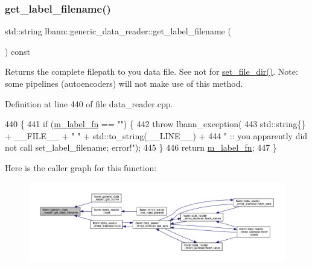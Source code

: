 \subsubsection{\texorpdfstring{get\+\_\+label\+\_\+filename()}{get\_label\_filename()}}
{\footnotesize\ttfamily std\+::string lbann\+::generic\+\_\+data\+\_\+reader\+::get\+\_\+label\+\_\+filename (\begin{DoxyParamCaption}{ }\end{DoxyParamCaption}) const}

Returns the complete filepath to you data file. See not for \hyperlink{classlbann_1_1generic__data__reader_a94a6db0b62d4c98202ef309eb76b220c}{set\+\_\+file\+\_\+dir()}. Note\+: some pipelines (autoencoders) will not make use of this method. 

Definition at line 440 of file data\+\_\+reader.\+cpp.


\begin{DoxyCode}
440                                                         \{
441   \textcolor{keywordflow}{if} (\hyperlink{classlbann_1_1generic__data__reader_a492d45c107df31b3e241e54d51950746}{m\_label\_fn} == \textcolor{stringliteral}{""}) \{
442     \textcolor{keywordflow}{throw} lbann\_exception(
443       std::string\{\} + \_\_FILE\_\_ + \textcolor{stringliteral}{" "} + std::to\_string(\_\_LINE\_\_) +
444       \textcolor{stringliteral}{" :: you apparently did not call set\_label\_filename; error!"});
445   \}
446   \textcolor{keywordflow}{return} \hyperlink{classlbann_1_1generic__data__reader_a492d45c107df31b3e241e54d51950746}{m\_label\_fn};
447 \}
\end{DoxyCode}
Here is the caller graph for this function\+:\nopagebreak
\begin{figure}[H]
\begin{center}
\leavevmode
\includegraphics[width=350pt]{classlbann_1_1generic__data__reader_af0f82d719fcd6e0668414836f2673d5c_icgraph}
\end{center}
\end{figure}
\mbox{\label{classlbann_1_1generic__data__reader_a79cb3bee4e0d19006ef9213763dc8af2}} 
